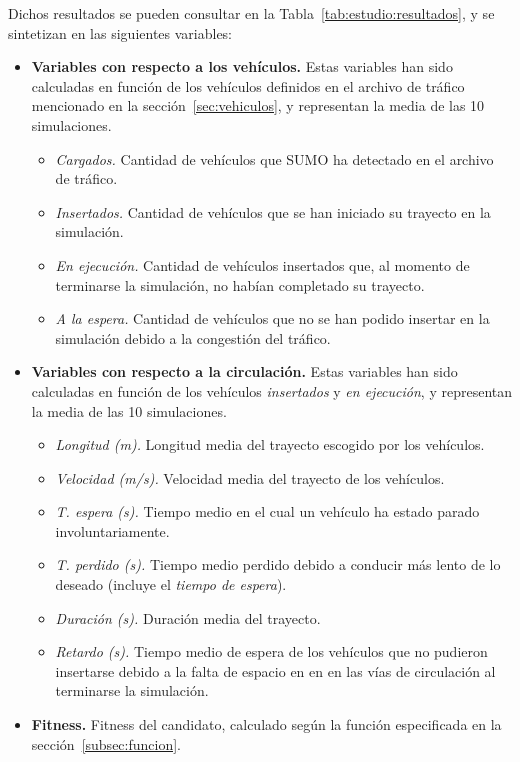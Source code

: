 Dichos resultados se pueden consultar en la Tabla~\ref{tab:estudio:resultados}, y se sintetizan en las siguientes variables:

\begin{itemize}
    \item \textbf{Variables con respecto a los vehículos.} Estas variables han sido calculadas en función de los vehículos definidos en el archivo de tráfico mencionado en la sección~\ref{sec:vehiculos}, y representan la media de las 10 simulaciones.
    \begin{itemize}
        \item \textit{Cargados.} Cantidad de vehículos que SUMO ha detectado en el archivo de tráfico.
        \item \textit{Insertados.} Cantidad de vehículos que se han iniciado su trayecto en la simulación.
        \item \textit{En ejecución.} Cantidad de vehículos insertados que, al momento de terminarse la simulación, no habían completado su trayecto.
        \item \textit{A la espera.} Cantidad de vehículos que no se han podido insertar en la simulación debido a la congestión del tráfico.
    \end{itemize}
    
    \item \textbf{Variables con respecto a la circulación.} Estas variables han sido calculadas en función de los vehículos \textit{insertados} y \textit{en ejecución}, y representan la media de las 10 simulaciones.
    \begin{itemize}
        \item \textit{Longitud (m).} Longitud media del trayecto escogido por los vehículos.
        \item \textit{Velocidad (m/s).} Velocidad media del trayecto de los vehículos.
        \item \textit{T. espera (s).} Tiempo medio en el cual un vehículo ha estado parado involuntariamente.
        \item \textit{T. perdido (s).} Tiempo medio perdido debido a conducir más lento de lo deseado (incluye el \textit{tiempo de espera}).
        \item \textit{Duración (s).} Duración media del trayecto.
        \item \textit{Retardo (s).} Tiempo medio de espera de los vehículos que no pudieron insertarse debido a la falta de espacio en en en las vías de circulación al terminarse la simulación.
    \end{itemize}
    
    \item \textbf{Fitness.} Fitness del candidato, calculado según la función especificada en la sección~\ref{subsec:funcion}.
\end{itemize}

